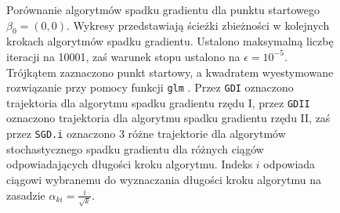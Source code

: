 \begin{figure}[hbt!]
  \caption[Porównanie algorytmów spadku gradientu dla punktu startowego $\beta_0 = (0,0)$.]{\label{fig:scasd}Porównanie algorytmów spadku gradientu dla punktu startowego $\beta_0 = (0,0)$. Wykresy przedstawiają ścieżki zbieżności w kolejnych krokach algorytmów spadku gradientu. Ustalono maksymalną liczbę iteracji na 10001, zaś warunek stopu ustalono na $\epsilon=10^{-5}$. Trójkątem zaznaczono punkt startowy, a kwadratem wyestymowane rozwiązanie przy pomocy funkcji \texttt{glm} \cite{glmglm}. Przez \texttt{GDI} oznaczono trajektoria dla algorytmu spadku gradientu rzędu I, przez \texttt{GDII} oznaczono trajektoria dla algorytmu spadku gradientu rzędu II, zaś przez \texttt{SGD.i} oznaczono 3 różne trajektorie dla algorytmów stochastycznego spadku gradientu dla różnych ciągów odpowiadających długości kroku algorytmu. Indeks $i$ odpowiada ciągowi wybranemu do wyznaczania długości kroku algorytmu na zasadzie $\alpha_{ki} = \frac{i}{\sqrt{k}}$.}
\end{figure}


